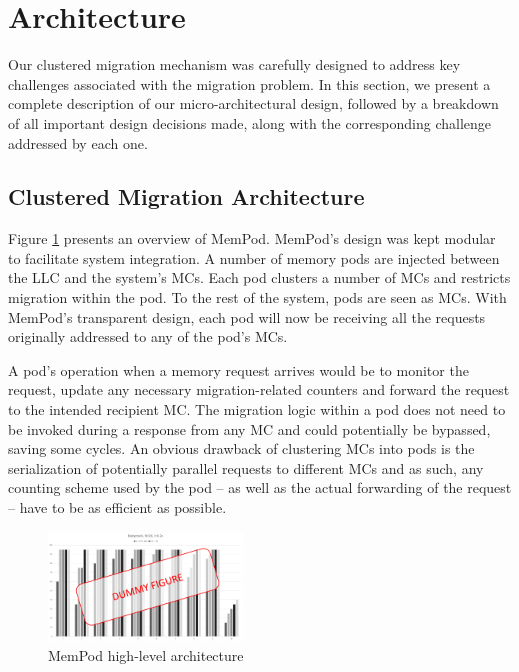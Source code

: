 \section{Architecture}
\label{sec:Architecture}

Our clustered migration mechanism was carefully designed to address key challenges associated with the migration problem. In this section, we present a complete description of our micro-architectural design, followed by a breakdown of all important design decisions made, along with the corresponding challenge addressed by each one.

\subsection{Clustered Migration Architecture}

 Figure \ref{fig:architecture_complete} presents an overview of MemPod. MemPod's design was kept modular to facilitate system integration. A number of memory pods are injected between the LLC and the system's MCs. Each pod clusters a number of MCs and restricts migration  within the pod. To the rest of the system, pods are seen as MCs. With MemPod's transparent design, each pod will now be receiving all the requests originally addressed to any of the pod's MCs. 

A pod's operation when a memory request arrives would be to monitor the request, update any necessary migration-related counters and forward the request to the intended recipient MC. The migration logic within a pod does not need to be invoked during a response from any MC and could potentially be bypassed, saving some cycles. An obvious drawback of clustering MCs into pods is the serialization of potentially parallel requests to different MCs and as such, any counting scheme used by the pod -- as well as the actual forwarding of the request -- have to be as efficient as possible. 

\begin{figure}[h]
  \includegraphics[width=0.46\textwidth]{figures/dummy.pdf}
  \caption{MemPod high-level architecture}
  \label{fig:architecture_complete}
\end{figure}

